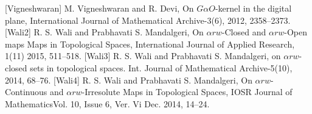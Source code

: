 \begin{thebibliography}{99}
 [Vigneshwaran] M. Vigneshwaran and R. Devi, On $G \alpha O$-kernel in the digital plane, International Journal of Mathematical Archive-3(6), 2012, 2358--2373.
 [Wali2] R. S. Wali and Prabhavati S. Mandalgeri, On $\alpha rw$-Closed and $\alpha rw$-Open maps Maps in Topological Spaces, International Journal of Applied Research, 1(11) 2015, 511--518.
 [Wali3] R. S. Wali and Prabhavati S. Mandalgeri, on $\alpha rw$-closed sets in topological spaces. Int. Journal of Mathematical Archive-5(10), 2014, 68--76.
 [Wali4] R. S. Wali and Prabhavati S. Mandalgeri, On $\alpha rw$-Continuous and $\alpha rw$-Irresolute Maps in Topological Spaces, IOSR Journal of MathematicsVol. 10, Issue 6, Ver. Vi Dec. 2014, 14--24.
\end{thebibliography}
